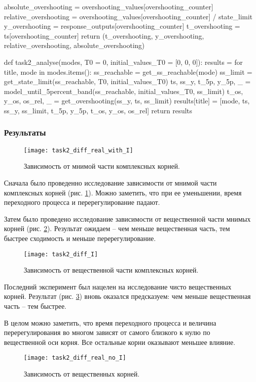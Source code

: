 \documentclass[16pt]{article}
\begin{document}
\begin{python}
    absolute_overshooting = overshooting_values[overshooting_counter]
    relative_overshooting = overshooting_values[overshooting_counter] / state_limit
    y_overshooting = response_outputs[overshooting_counter]
    t_overshooting = ts[overshooting_counter]
    return (t_overshooting, y_overshooting, relative_overshooting, absolute_overshooting)
    
    

def task2_analyse(modes, T0 = 0, initial_values_T0 = [0, 0, 0]):
    results = {}
    for title, mode in modes.items():
        ss_reachable = get_ss_reachable(mode)
        ss_limit = get_state_limit(ss_reachable, T0, initial_values_T0)
        ts, ss_y, t_5p, y_5p, _ = model_until_5percent_band(ss_reachable, initial_values_T0, ss_limit)
        t_os, y_os, os_rel, _ = get_overshooting(ss_y, ts, ss_limit)
        results[title] = [mode, ts, ss_y, ss_limit, t_5p, y_5p, t_os, y_os, os_rel]
    return results
\end{python}
\pagebreak
\subsubsection{Результаты}
\begin{figure}[h!]
    \centering
    \texttt{[image: task2\_diff\_real\_with\_I]}
    \caption{Зависимость от мнимой части комплексных корней.}
    \label{fig:fig5}
\end{figure}
Сначала было проведенно исследование зависимости от мнимой части комплексных корней (рис. \ref{fig:fig5}).
Можно заметить, что при ее уменьшении, время переходного процесса и перерегулирование падают.

Затем было проведено исследование зависимости от вещественной части мнимых корней (рис. \ref{fig:fig4}). Результат ожидаем -- чем меньше вещественная часть, тем быстрее сходимость и меньше перерегулирование.
\begin{figure}[h!]
    \centering
    \texttt{[image: task2\_diff\_I]}
    \caption{Зависимость от вещественной части комплексных корней.}
    \label{fig:fig4}
\end{figure}

Последний эксперимент был нацелен на исследование чисто вещественных корней. 
Результат (рис. \ref{fig:fig6}) вновь оказался предсказуем: чем меньше вещественная часть -- тем быстрее.

В целом можно заметить, что время переходного процесса и величина перерегулирования во многом зависят от самого близкого к нулю по вещественной оси корня. Все остальные корни оказывают меньшее влияние.
\begin{figure}[h!]
    \centering
    \texttt{[image: task2\_diff\_real\_no\_I]}
    \caption{Зависимость от вещественных корней.}
    \label{fig:fig6}
\end{figure}
\end{document}
